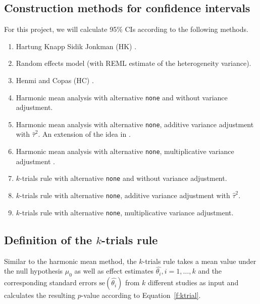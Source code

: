\documentclass[letterpaper, 12pt]{article}
\begin{document}
\subsection{Construction methods for confidence intervals} \label{sec:method}

For this project, we will calculate 95\% CIs according to the following methods.

\begin{enumerate}
\item Hartung Knapp Sidik Jonkman (HK) \citep{IntHoutIoannidis}.
\item Random effects model (with REML estimate of the heterogeneity variance).
\item Henmi and Copas (HC) \citep{henm:copa:10}.
\item Harmonic mean analysis with alternative \texttt{none} \citep{Held2020b}
  and without variance adjustment. %
\item Harmonic mean analysis with alternative \texttt{none}, additive variance
  adjustment with $\hat \tau^2$. An extension of the idea in \citet{Held2020b}. 
\item Harmonic mean analysis with alternative \texttt{none}, multiplicative
  variance adjustment \citep{mawd:etal:17}.
\item $k$-trials rule with alternative \texttt{none} and without
  variance adjustment.
\item $k$-trials rule with alternative \texttt{none}, additive variance
  adjustment with $\hat \tau^2$. 
\item $k$-trials rule with alternative \texttt{none}, multiplicative variance
  adjustment.
\end{enumerate}

\subsection{Definition of the $k$-trials rule} \label{sec:ktrial}

Similar to the harmonic mean method, the $k$-trials rule takes a mean value
under the null hypothesis $\mu_{0}$ as well as effect estimates
$\hat{\theta_{i}}, i = 1, \dots, k$ and the corresponding standard errors
$\text{se}(\hat{\theta_i})$ from $k$ different studies as input and calculates
the resulting $p$-value according to Equation~\ref{f:ktrial}.
\end{document}
